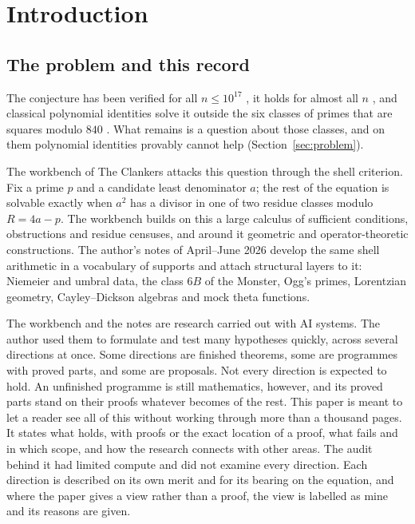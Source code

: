 \section*{Introduction}\label{sec:about}

\subsection*{The problem and this record}

The conjecture has been verified for all $n\le10^{17}$ \cite{Salez}, it holds for almost all $n$ \cite{Vaughan}, and classical polynomial identities solve it outside the six classes of primes that are squares modulo $840$ \cite{ElsholtzTao,Mordell}. What remains is a question about those classes, and on them polynomial identities provably cannot help (Section~\ref{sec:problem}).

The workbench of The Clankers attacks this question through the shell criterion. Fix a prime $p$ and a candidate least denominator $a$; the rest of the equation is solvable exactly when $a^2$ has a divisor in one of two residue classes modulo $R=4a-p$. The workbench builds on this a large calculus of sufficient conditions, obstructions and residue censuses, and around it geometric and operator-theoretic constructions. The author's notes of April--June 2026 develop the same shell arithmetic in a vocabulary of supports and attach structural layers to it: Niemeier and umbral data, the class $6B$ of the Monster, Ogg's primes, Lorentzian geometry, Cayley--Dickson algebras and mock theta functions.

The workbench and the notes are research carried out with AI systems. The author used them to formulate and test many hypotheses quickly, across several directions at once. Some directions are finished theorems, some are programmes with proved parts, and some are proposals. Not every direction is expected to hold. An unfinished programme is still mathematics, however, and its proved parts stand on their proofs whatever becomes of the rest.
This paper is meant to let a reader see all of this without working through more than a thousand pages. It states what holds, with proofs or the exact location of a proof, what fails and in which scope, and how the research connects with other areas. The audit behind it had limited compute and did not examine every direction. Each direction is described on its own merit and for its bearing on the equation, and where the paper gives a view rather than a proof, the view is labelled as mine and its reasons are given.


